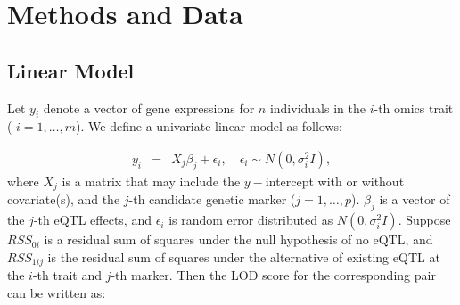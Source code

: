 \documentclass[9pt,twocolumn,twoside,lineno]{gsag3jnl}
\begin{document}
\section{Methods and Data}
\label{sec:methods:Data}


\subsection{Linear Model} 
 Let $y_i$ denote a vector of gene expressions for $n$
individuals in the $i$-th omics trait ( $i=1,\ldots,m$).  We
define a univariate linear model as follows:

\begin{eqnarray*}
	y_i &=& X_j \beta_j+ \epsilon_i,
	\quad \epsilon_i \sim N(0,\sigma_i^2I),
\end{eqnarray*}
where ${X}_j$ is a matrix that may include the $y-$intercept with
or without covariate(s), and the $j$-th candidate genetic marker
($j=1,\ldots,p$).  ${\beta}_j$ is a vector of the $j$-th eQTL
effects, and ${\epsilon}_i$ is random error distributed as $N(0,\sigma_i^2I)$.  Suppose $RSS_{0i}$
is a residual sum of squares under the null hypothesis of no eQTL, and $RSS_{1ij}$ is the residual sum of squares under the
alternative of existing eQTL at the $i$-th trait and $j$-th marker.  Then the LOD
score for the corresponding pair can be written as:
\end{document}
